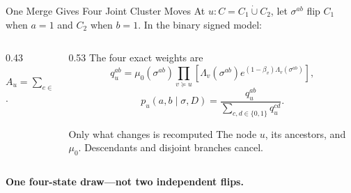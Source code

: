 \begin{frame}{One Merge Gives Four Joint Cluster Moves}
  At $u:C=C_1\mathbin{\dot\cup}C_2$, let $\sigma^{ab}$ flip $C_1$ when $a=1$
  and $C_2$ when $b=1$.  In the binary signed model:

  \begin{columns}[onlytextwidth,c]
    \begin{column}{0.43\textwidth}
      \centering

      \vspace{0.4em}
      $\displaystyle A_u=\sum_{e\in E_u}|W_e|$.
    \end{column}

    \begin{column}{0.53\textwidth}
      The four exact weights are
      \[
        q_u^{ab}
        =\mu_0(\sigma^{ab})
        \prod_{v\succeq u}
        \left[
          \Lambda_v(\sigma^{ab})
          e^{(1-\beta_v)\Lambda_v(\sigma^{ab})}
        \right],
      \]
      \[
        \boxed{
        p_u(a,b\mid\sigma,D)
        =\frac{q_u^{ab}}
        {\displaystyle\sum_{c,d\in\{0,1\}}q_u^{cd}}.}
      \]

      \begin{block}{Only what changes is recomputed}
        The node $u$, its ancestors, and $\mu_0$.
        Descendants and disjoint branches cancel.
      \end{block}
    \end{column}
  \end{columns}

  \begin{center}
    \textcolor{inria-2024-rouge}{\textbf{One four-state draw---not two independent flips.}}
  \end{center}
\end{frame}

